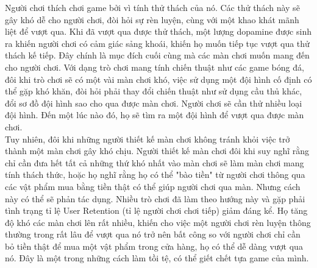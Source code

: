 \begin{itemize}
	Người chơi thích chơi game bởi vì tính thử thách của nó. Các thử thách này sẽ gây khó dễ cho người chơi, đòi hỏi sự rèn luyện, cùng với một khao khát mãnh liệt để vượt qua. Khi đã vượt qua được thử thách, một lượng dopamine được sinh ra khiến người chơi có cảm giác sảng khoái, khiến họ muốn tiếp tục vượt qua thử thách kế tiếp. Đây chính là mục đích cuối cùng mà các màn chơi muốn mang đến cho người chơi. Với dạng trò chơi mang tính chiến thuật như các game bóng đá, đôi khi trò chơi sẽ có một vài màn chơi khó, việc sử dụng một đội hình cố định có thể gặp khó khăn, đòi hỏi phải thay đổi chiến thuật như sử dụng cầu thủ khác, đổi sơ đồ đội hình sao cho qua được màn chơi. Người chơi sẽ cần thử nhiều loại đội hình. Đến một lúc nào đó, họ sẽ tìm ra một đội hình để vượt qua được màn chơi.\\
	Tuy nhiên, đôi khi những người thiết kế màn chơi không tránh khỏi việc trở thành một màn chơi gây khó chịu. Người thiết kế màn chơi đôi khi suy nghĩ rằng chỉ cần đưa hết tất cả những thứ khó nhất vào màn chơi sẽ làm màn chơi mang tính thách thức, hoặc họ nghĩ rằng họ có thể "bào tiền" từ người chơi thông qua các vật phẩm mua bằng tiền thật có thể giúp người chơi qua màn. Nhưng cách này có thể sẽ phản tác dụng. Nhiều trò chơi đã làm theo hướng này và gặp phải tình trạng tỉ lệ User Retention (tỉ lệ người chơi chơi tiếp) giảm đáng kể. Họ tăng độ khó các màn chơi lên rất nhiều, khiến cho việc một người chơi rèn luyện thông thường trong rất lâu để vượt qua nó trở nên bất công so với người chơi chỉ cần bỏ tiền thật để mua một vật phẩm trong cửa hàng, họ có thể dễ dàng vượt qua nó. Đây là một trong những cách làm tồi tệ, có thể giết chết tựa game của mình.\\

\end{itemize}
